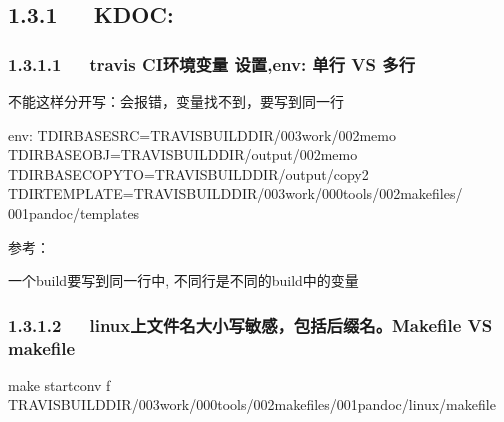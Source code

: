 \documentclass[letterpaper,12pt,english]{sphinxmanual}
\begin{document}
\subsection{1.3.1   KDOC:}
\label{\detokenize{001software/001install/001._u7f51_u7ad9/travisCI:kdoc}}

\subsubsection{1.3.1.1   travis CI环境变量 设置,env: \sphinxhyphen{}单行 VS 多行}
\label{\detokenize{001software/001install/001._u7f51_u7ad9/travisCI:travis-ci-env-vs}}
不能这样分开写：会报错，变量找不到，要写到同一行

\begin{sphinxVerbatim}[commandchars=\\\{\}]
env:
  \PYGZhy{} T\PYGZus{}DIR\PYGZus{}BASE\PYGZus{}SRC=\PYGZdl{}TRAVIS\PYGZus{}BUILD\PYGZus{}DIR/003work/002memo
  \PYGZhy{} T\PYGZus{}DIR\PYGZus{}BASE\PYGZus{}OBJ=\PYGZdl{}TRAVIS\PYGZus{}BUILD\PYGZus{}DIR/output/002memo
  \PYGZhy{} T\PYGZus{}DIR\PYGZus{}BASE\PYGZus{}COPYTO=\PYGZdl{}TRAVIS\PYGZus{}BUILD\PYGZus{}DIR/output/copy2
  \PYGZhy{} T\PYGZus{}DIR\PYGZus{}TEMPLATE=\PYGZdl{}TRAVIS\PYGZus{}BUILD\PYGZus{}DIR/003work/000tools/002makefiles/   001pandoc/templates
\end{sphinxVerbatim}

参考：


\begin{sphinxVerbatim}[commandchars=\\\{\}]
    
\end{sphinxVerbatim}

一个build要写到同一行中, 不同行是不同的build中的变量


\subsubsection{1.3.1.2   linux上文件名大小写敏感，包括后缀名。Makefile VS makefile}
\label{\detokenize{001software/001install/001._u7f51_u7ad9/travisCI:linux-makefile-vs-makefile}}
\begin{sphinxVerbatim}[commandchars=\\\{\}]
make startconv \PYGZhy{}f \PYGZdl{}TRAVIS\PYGZus{}BUILD\PYGZus{}DIR/003work/000tools/002makefiles/001pandoc/linux/makefile
\end{sphinxVerbatim}
\end{document}
